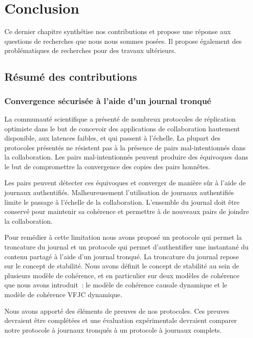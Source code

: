 
\chapter{Conclusion}\label{ch:conclusion}

\minitoc{}
\bigskip

Ce dernier chapitre synthétise nos contributions et propose une réponse aux questions de recherches que nous nous sommes posées.
Il propose également des problématiques de recherches pour des travaux ultérieurs.

\clearpage
\section{Résumé des contributions}

\subsection{Convergence sécurisée à l'aide d'un journal tronqué}

La communauté scientifique a présenté de nombreux protocoles de réplication optimiste dans le but de concevoir des applications de collaboration hautement disponible, aux latences faibles, et qui passent à l'échelle.
La plupart des protocoles présentés ne résistent pas à la présence de pairs mal-intentionnés dans la collaboration.
Les pairs mal-intentionnés peuvent produire des équivoques dans le but de compromettre la convergence des copies des pairs honnêtes.

Les pairs peuvent détecter ces équivoques et converger de manière sûr à l'aide de journaux authentifiés.
Malheureusement l'utilisation de journaux authentifiés limite le passage à l'échelle de la collaboration.
L'ensemble du journal doit être conservé pour maintenir sa cohérence et permettre à de nouveaux pairs de joindre la collaboration.

Pour remédier à cette limitation nous avons proposé un protocole qui permet la troncature du journal et un protocole qui permet d'authentifier une instantané du contenu partagé à l'aide d'un journal tronqué.
La troncature du journal repose sur le concept de stabilité.
Nous avons définit le concept de stabilité au sein de plusieurs modèle de cohérence, et en particulier sur deux modèles de cohérence que nous avons introduit~: le modèle de cohérence causale dynamique et le modèle de cohérence \acl{VFJC} dynamique.

Nous avons apporté des éléments de preuves de nos protocoles.
Ces preuves devraient être complétées et une évaluation expérimentale devraient comparer notre protocole à journaux tronqués à un protocole à journaux complets.



